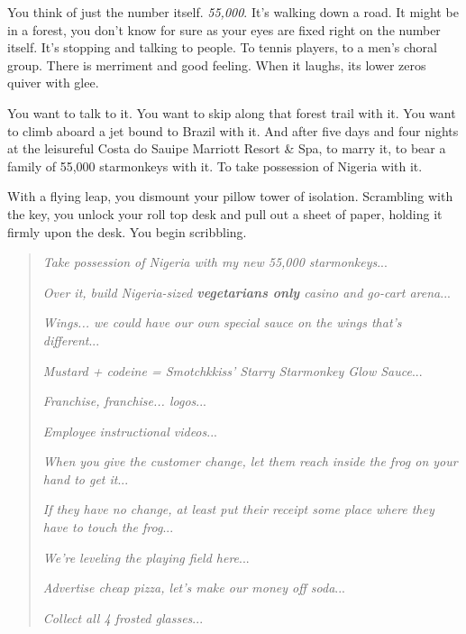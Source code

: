 \documentclass[10pt,twoside]{report}
\begin{document}
You think of just the number itself.  {\em 55,000}.  It's walking down
a road.  It might be in a forest, you don't know for sure as your eyes
are fixed right on the number itself.  It's stopping and talking to
people.  To tennis players, to a men's choral group.  There is
merriment and good feeling.  When it laughs, its lower zeros quiver
with glee.

You want to talk to it.  You want to skip along that forest trail with
it.  You want to climb aboard a jet bound to Brazil with it.  And
after five days and four nights at the leisureful Costa do Sauipe
Marriott Resort \& Spa, to marry it, to bear a family of 55,000
starmonkeys with it. To take possession of Nigeria with it.

With a flying leap, you dismount your pillow tower of isolation.
Scrambling with the key, you unlock your roll top desk and pull out a
sheet of paper, holding it firmly upon the desk.  You begin
scribbling.

\begin{quote}


 {\em Take possession of Nigeria with my new 55,000 starmonkeys}...

 

 {\em Over it, build Nigeria-sized {\bf vegetarians only} casino and
   go-cart arena}...

 

 {\em Wings... we could have our own special sauce on the wings that's
   different}...

 

 {\em Mustard + codeine = Smotchkkiss' Starry Starmonkey Glow
   Sauce}...

 

 {\em Franchise, franchise... logos}...

 

 {\em Employee instructional videos}...

 

 {\em When you give the customer change, let them reach inside the
   frog on your hand to get it}...

 

 {\em If they have no change, at least put their receipt some place
   where they have to touch the frog}...

 

 {\em We're leveling the playing field here}...

 

 {\em Advertise cheap pizza, let's make our money off soda}...

 

 {\em Collect all 4 frosted glasses}...

\end{quote}
\end{document}
